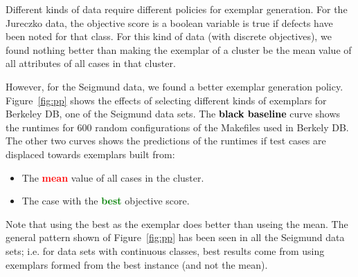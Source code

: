 \documentclass[conference]{IEEEtran}
\newcommand{\bi}{\begin{itemize}}
\newcommand{\ei}{\end{itemize}}
\newcommand{\fig}[1]{Figure~\ref{fig:#1}}
\begin{document}
Different kinds of data require
different policies for exemplar generation.
For the Jureczko data, the objective score
is a boolean variable is true if defects have been noted
for that class.  For this kind of data (with discrete objectives),
we found nothing better than  making the exemplar of a cluster be the mean
value of all attributes of all cases in that cluster.

However, for the Seigmund data, we found a better exemplar generation policy.
\fig{pp} shows the effects of selecting different kinds of exemplars for 
Berkeley DB, one of the Seigmund data sets.
The \textcolor{black}{\bf black baseline} curve  shows the runtimes for 600 random configurations
of the Makefiles used in Berkely DB. The other two curves shows the predictions of the runtimes if test cases are displaced towards exemplars
  built from:
\bi
\item The \textcolor{red}{\bf   mean}    value of all cases in the  cluster.
\item The  case with the \textcolor{green}{\bf  best}  objective score. 
\ei
Note that using the best as the exemplar does better than useing the mean.
The general pattern shown of \fig{pp} has been seen in all the Seigmund data sets;
i.e. for data sets with continuous classes,
best results come from using exemplars formed from the best instance (and not the mean). 

  
  
\end{document}
